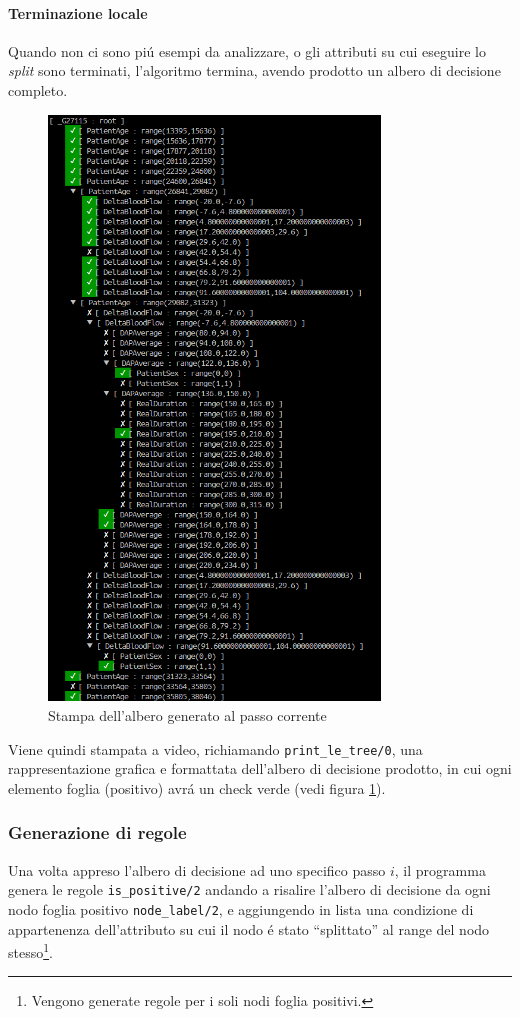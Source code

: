 \documentclass[preprint]{acm_proc_article-sp}
\begin{document}
\paragraph{Terminazione locale}
Quando non ci sono pi\'u esempi da analizzare, o gli attributi su cui eseguire lo \textit{split} sono terminati, l'algoritmo termina, avendo prodotto un albero di decisione completo.

\begin{figure}[!h]
\centering
\includegraphics[width=250pt]{figures/prolog-le-tree.png}
\caption{Stampa dell'albero generato al passo corrente}
\label{fig:prolog-le-tree}
\end{figure}

Viene quindi stampata a video, richiamando \verb|print_le_tree/0|, una rappresentazione grafica e formattata dell'albero di decisione prodotto, in cui ogni elemento foglia (positivo) avr\'a un check verde (vedi figura \ref{fig:prolog-le-tree}).

\subsubsection{Generazione di regole}
Una volta appreso l'albero di decisione ad uno specifico passo $i$, il programma genera le regole \verb|is_positive/2| andando a risalire l'albero di decisione da ogni nodo foglia positivo \verb|node_label/2|, e aggiungendo in lista una condizione di appartenenza dell'attributo su cui il nodo \'e stato ``splittato'' al range del nodo stesso\footnote{Vengono generate regole per i soli nodi foglia positivi.}.
\end{document}
